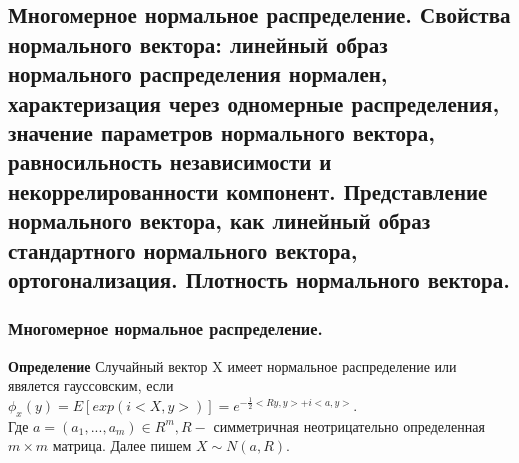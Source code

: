 \subsection{Многомерное нормальное распределение. Свойства нормального вектора: линейный образ нормального распределения нормален, характеризация через одномерные распределения, значение параметров нормального вектора, равносильность независимости и некоррелированности компонент. Представление нормального вектора, как линейный образ стандартного нормального вектора, ортогонализация. Плотность нормального вектора.}
\subsubsection{Многомерное нормальное распределение.}
\textbf{Определение} Случайный вектор X имеет нормальное распределение или явялется гауссовским, если $\phi_x(y) = E[exp(i<X, y>)] = e^{-\frac{1}{2}<Ry, y> + i<a, y>}$.\\
Где $a = (a_1, ..., a_m) \in R^m, R -$ симметричная неотрицательно определенная $m\times m$ матрица. Далее пишем $X \sim N(a, R)$.\\
